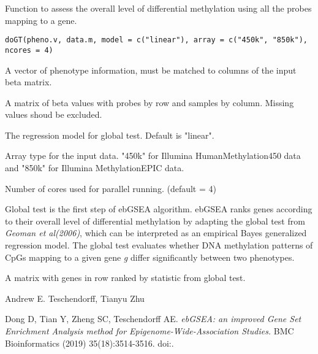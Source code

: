 \documentclass[letterpaper]{book}
\begin{document}
%
\begin{Description}\relax
Function to assess the overall level of differential methylation using all the probes mapping to a gene.
\end{Description}
%
\begin{Usage}
\begin{verbatim}
doGT(pheno.v, data.m, model = c("linear"), array = c("450k", "850k"), ncores = 4)
\end{verbatim}
\end{Usage}
%
\begin{Arguments}
\begin{ldescription}
\item[\code{pheno.v}] A vector of phenotype information, must be matched to columns of the input beta matrix.

\item[\code{data.m}] A matrix of beta values with probes by row and samples by column. Missing values shoud be excluded.

\item[\code{model}] The regression model for global test. Default is "linear".

\item[\code{array}] Array type for the input data. "450k" for Illumina HumanMethylation450 data and "850k" for Illumina MethylationEPIC data.

\item[\code{ncores}] Number of cores used for parallel running. (default = 4)
\end{ldescription}
\end{Arguments}
%
\begin{Details}\relax
Global test is the first step of ebGSEA algorithm. ebGSEA ranks genes according to their overall level of differential methylation by adapting the global test from \emph{Geoman et al(2006)}, which can be interpreted as an empirical Bayes generalized regression model. The global test evaluates whether DNA methylation patterns of CpGs mapping to a given gene \emph{g} differ significantly between two phenotypes.
\end{Details}
%
\begin{Value}
A matrix with genes in row ranked by statistic from global test.
\end{Value}
%
\begin{Author}\relax
Andrew E. Teschendorff, Tianyu Zhu
\end{Author}
%
\begin{References}\relax
Dong D, Tian Y, Zheng SC, Teschendorff AE.
\emph{ebGSEA: an improved Gene Set Enrichment Analysis method for Epigenome-Wide-Association Studies.}
BMC Bioinformatics (2019) 35(18):3514-3516.
doi:.
\end{References}
\end{document}
